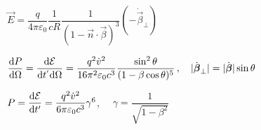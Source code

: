 
\begin{squishlist}
\item $\vec{E} = \dfrac{q}{4\pi\varepsilon_0}\dfrac{1}{cR}\dfrac{1}{(1-\vec{n}\cdot\vec{\beta})^3}(-\dot{\vec{\beta}}_{\perp})$

\item $\dfrac{\textrm{d} P}{\textrm{d} \Omega} = \dfrac{\textrm{d} \mathcal{E}}{\textrm{d} t^{'}\textrm{d} \Omega} = \dfrac{q^2 \dot{v}^2}{16\pi^2\varepsilon_0c^3}\dfrac{\sin^2\theta}{(1-\beta\cos\theta)^5} \, , \quad |\dot{\mbox{\boldmath$\beta$}}_{\perp}| = |\dot{\mbox{\boldmath$\beta$}}|\sin\theta$

\item $P = \dfrac{\textrm{d} \mathcal{E}}{\textrm{d} t'} = \dfrac{q^2 \dot{v}^2}{6 \pi \varepsilon_0 c^3} \gamma^6$, $\quad \gamma = \dfrac{1}{\sqrt{1-\beta^2}}$
\end{squishlist}


